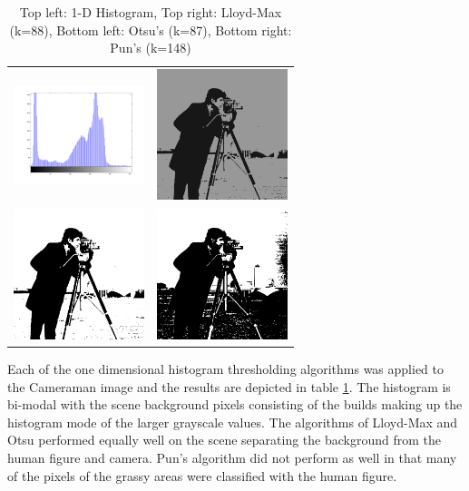\documentclass[journal]{IEEEtran}
\begin{document}
\begin{table}[!h]
\centering
\begin{tabular}{cc}
\includegraphics[width=1.5in]{../results/cameraman_hist.png} &
\includegraphics[width=1.5in]{../results/cameraman_lloydmax.png} \\
\newline
\includegraphics[width=1.5in]{../results/cameraman_otsu.png} &
\includegraphics[width=1.5in]{../results/cameraman_pun.png} \\
\end{tabular}
\caption{Top left: 1-D Histogram, Top right: Lloyd-Max (k=88), Bottom left: Otsu's (k=87), Bottom right: Pun's (k=148)}
\label{tab:cameramanTable1}
\end{table}

\par Each of the one dimensional histogram thresholding algorithms was applied to the Cameraman image and the results are depicted in table \ref{tab:cameramanTable1}. The histogram is bi-modal with the scene background pixels consisting of the builds making up the histogram mode of the larger grayscale values. The algorithms of Lloyd-Max and Otsu performed equally well on the scene separating the background from the human figure and camera. Pun's algorithm did not perform as well in that many of the pixels of the grassy areas were classified with the human figure.
\end{document}
